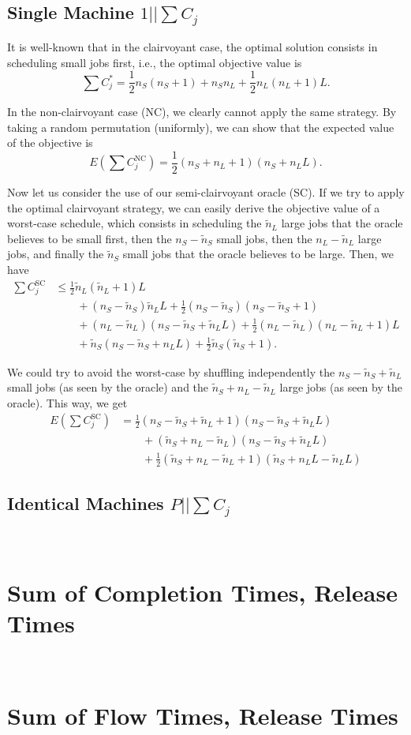 \documentclass{article}
\newcommand{\definecomment}[3]{%
        \fbox{\bfseries\sffamily\scriptsize #1}%
        ~{\small\textsf{\emph{\color{#3}{#2}}}}}
\newcommand{\definecomment}[3]{}
\newcommand{\ad}[1]{\definecomment{AD}{#1}{red}}
\begin{document}
\subsection{Single Machine \(1||\sum C_j\)}

It is well-known that in the clairvoyant case, the optimal solution consists in scheduling small
jobs first, i.e., the optimal objective value is
\[
    \sum C_j^*=\frac{1}{2}n_S(n_S+1)+n_Sn_L+\frac{1}{2}n_L(n_L+1)L.
\]

In the non-clairvoyant case (NC), we clearly cannot apply the same strategy. By taking a random
permutation (uniformly), we can show that the expected value of the objective is
\[
    E(\sum C_j^{\mathrm{NC}})=\frac{1}{2}(n_S+n_L+1)(n_S+n_LL).
\]

Now let us consider the use of our semi-clairvoyant oracle (SC). If we try to apply the optimal
clairvoyant strategy, we can easily derive the objective value of a worst-case schedule, which
consists in scheduling the \(\tilde{n}_L\) large jobs that the oracle believes to be small first,
then the \(n_S-\tilde{n}_S\) small jobs, then the \(n_L-\tilde{n}_L\) large jobs, and finally the
\(\tilde{n}_S\) small jobs that the oracle believes to be large. Then, we have
\begin{align*}
    \sum C_j^{\mathrm{SC}}
        &\le\frac{1}{2}\tilde{n}_L(\tilde{n}_L+1)L\\
        &\qquad+(n_S-\tilde{n}_S)\tilde{n}_LL+\frac{1}{2}(n_S-\tilde{n}_S)(n_S-\tilde{n}_S+1)\\
        &\qquad+(n_L-\tilde{n}_L)(n_S-\tilde{n}_S+\tilde{n}_LL)+\frac{1}{2}(n_L-\tilde{n}_L)(n_L-\tilde{n}_L+1)L\\
        &\qquad+\tilde{n}_S(n_S-\tilde{n}_S+n_LL)+\frac{1}{2}\tilde{n}_S(\tilde{n}_S+1).
\end{align*}

We could try to avoid the worst-case by shuffling independently the \(n_S-\tilde{n}_S+\tilde{n}_L\)
small jobs (as seen by the oracle) and the \(\tilde{n}_S+n_L-\tilde{n}_L\) large jobs (as seen by
the oracle). This way, we get
\begin{align*}
    E(\sum C_j^{\mathrm{SC}})
        &=\frac{1}{2}(n_S-\tilde{n}_S+\tilde{n}_L+1)(n_S-\tilde{n}_S+\tilde{n}_LL)\\
        &\qquad+(\tilde{n}_S+n_L-\tilde{n}_L)(n_S-\tilde{n}_S+\tilde{n}_LL)\\
        &\qquad+\frac{1}{2}(\tilde{n}_S+n_L-\tilde{n}_L+1)(\tilde{n}_S+n_LL-\tilde{n}_LL)
\end{align*}

\subsection{Identical Machines \(P||\sum C_j\)}

\ad{TODO}

\section{Sum of Completion Times, Release Times}

\ad{TODO}

\section{Sum of Flow Times, Release Times}

\ad{TODO}
\end{document}

